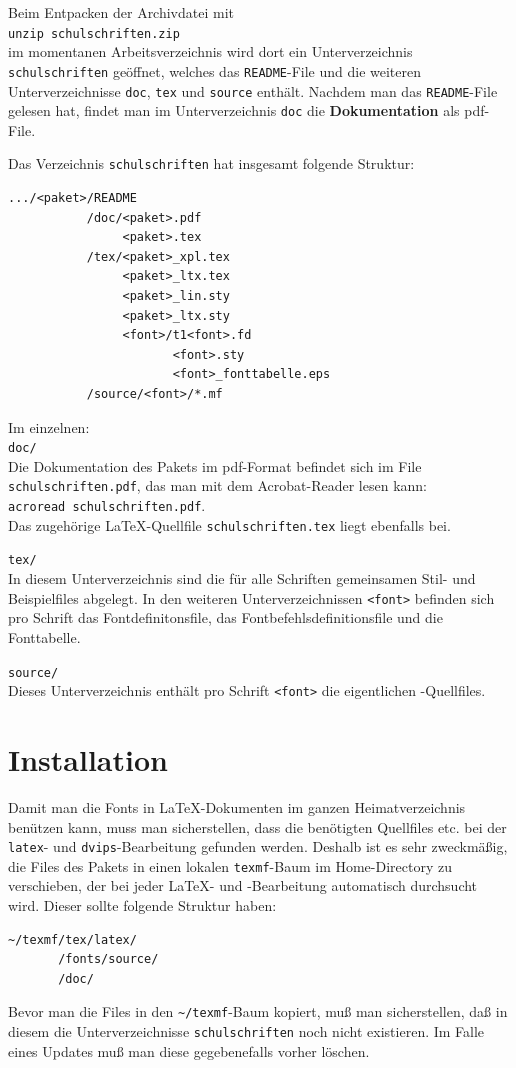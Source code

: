 \documentclass[12pt,titlepage]{article}
\begin{document}
Beim Entpacken der Archivdatei mit\\
\verb+unzip schulschriften.zip+ \\
im momentanen Arbeitsverzeichnis wird dort ein Unterverzeichnis
\verb+schulschriften+ ge\"offnet, welches das \verb+README+-File und die
weiteren 
Unterverzeichnisse \verb+doc+, \verb+tex+ und \verb+source+
enth\"alt. 
Nachdem man das \verb+README+-File gelesen hat, findet man im Unterverzeichnis
\verb+doc+ die  {\bfseries Dokumentation} als pdf-File.

Das Verzeichnis \verb+schulschriften+ hat insgesamt folgende Struktur:
\begin{verbatim}
.../<paket>/README
           /doc/<paket>.pdf
                <paket>.tex
           /tex/<paket>_xpl.tex
                <paket>_ltx.tex
                <paket>_lin.sty
                <paket>_ltx.sty
                <font>/t1<font>.fd
                       <font>.sty
                       <font>_fonttabelle.eps 
           /source/<font>/*.mf
\end{verbatim}

\newpage
Im einzelnen:\\
\verb+doc/+\\
Die Dokumentation des Pakets im pdf-Format  befindet sich im File
\verb+schulschriften.pdf+, das man mit dem Acrobat-Reader lesen kann:\\
\verb+acroread schulschriften.pdf+.\\
Das
zugeh\"orige \LaTeX-Quellfile \verb+schulschriften.tex+ liegt
ebenfalls bei.

\verb+tex/+\\
In diesem Unterverzeichnis sind die f\"ur alle Schriften gemeinsamen
Stil- und Beispielfiles
abgelegt. In den weiteren Unterverzeichnissen
 \verb+<font>+ befinden sich pro Schrift das
Fontdefinitonsfile, das Fontbefehlsdefinitionsfile 
und die Fonttabelle.

\verb+source/+\\
Dieses Unterverzeichnis enth\"alt pro Schrift \verb+<font>+ die eigentlichen
\MF-Quellfiles.

\section{Installation}
Damit man die Fonts in \LaTeX-Dokumenten im 
 ganzen Heimatverzeichnis
ben\"utzen kann, muss man sicherstellen, dass die ben\"otigten Quellfiles etc.
bei der \verb+latex+- und \verb+dvips+-Bearbeitung gefunden werden. 
Deshalb ist es sehr zweckm\"a\ss{}ig, die Files des Pakets
in einen lokalen \verb+texmf+-Baum im Home-Directory zu verschieben,
der bei jeder \LaTeX- und \MF-Bearbeitung automatisch durchsucht wird.
Dieser sollte folgende Struktur haben:
\begin{verbatim}
~/texmf/tex/latex/
       /fonts/source/
       /doc/
\end{verbatim}
Bevor man die Files in den \verb+~/texmf+-Baum kopiert, mu\ss{}
man sicherstellen, da\ss{} in diesem die Unterverzeichnisse 
\verb+schulschriften+ noch nicht existieren. Im Falle eines Updates
mu\ss{} man diese gegebenefalls vorher l\"oschen.
\end{document}
